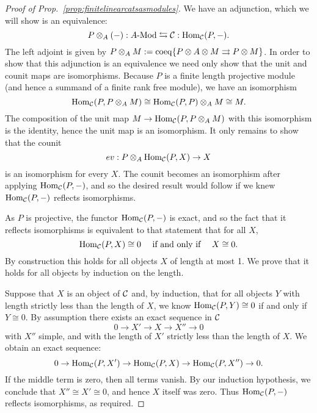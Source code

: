 \documentclass{amsart}
\begin{document}
\begin{proof}[Proof of Prop.~\ref{prop:finitelinearcatsasmodules}]
We have an adjunction, which we will show is an equivalence:
	\begin{equation*}
		P \otimes_A (-):\Mod{A}{} \leftrightarrows \cC: \Hom_{\cC}(P,-).
	\end{equation*}
	The left adjoint is given by $P \otimes_A M := \operatorname{coeq}\{ P \otimes A \otimes M \rightrightarrows P \otimes M\}$.  In order to show that this adjunction is an equivalence we need only show that the unit and counit maps are isomorphisms.
Because $P$ is a finite length projective module (and hence a summand of a finite rank free module), we have an isomorphism
\begin{equation*}
	\operatorname{Hom}_{\mathcal C}(P, P \otimes_A M) \cong \operatorname{Hom}_{\mathcal C}(P, P) \otimes_A M \cong M.
\end{equation*}
The composition of the unit map $M \rightarrow\operatorname{Hom}_{\mathcal C}(P, P \otimes_A M)$ with this isomorphism is the identity, hence the unit map is an isomorphism. It only remains to show that the counit 
\begin{equation*}
	ev:P \otimes_A \operatorname{Hom}_{\mathcal C}(P, X) \to X
\end{equation*}
is an isomorphism for every $X$. The counit becomes an isomorphism after applying $\operatorname{Hom}_{\mathcal C}(P,-)$, and so the desired result would follow if we knew $\operatorname{Hom}_{\mathcal C}(P,-)$ reflects isomorphisms. 

As $P$ is projective, the functor $\operatorname{Hom}_{\mathcal C}(P,-)$ is exact, and so the fact that it reflects isomorphisms is equivalent to that statement that for all $X$, 
\begin{equation*}
	\operatorname{Hom}_{\mathcal C}(P,X) \cong 0 \quad \textrm{ if and only if } \quad X \cong 0.
\end{equation*} 
By construction this holds for all objects $X$ of length at most 1. We prove that it holds for all objects by induction on the length. 

Suppose that $X$ is an object of $\mathcal C$ and, by induction, that for all objects $Y$ with length strictly less than the length of $X$, we know $\operatorname{Hom}_{\mathcal C}(P,Y) \cong 0$ if and only if $Y \cong 0$. By assumption there exists an exact sequence in $\mathcal C$
\begin{equation*}
	0 \to X' \to X \to X'' \to 0
\end{equation*}
with $X''$ simple, and with the length of $X'$ strictly less than the length of $X$. We obtain an exact sequence:
\begin{equation*}
	0 \to \operatorname{Hom}_{\mathcal C}(P,X') \to \operatorname{Hom}_{\mathcal C}(P,X) \to \operatorname{Hom}_{\mathcal C}(P,X'') \to 0.
\end{equation*}
If the middle term is zero, then all terms vanish. By our induction hypothesis, we conclude that $X'' \cong X' \cong 0$, and hence $X$ itself was zero. Thus $\operatorname{Hom}_{\mathcal C}(P,-)$ reflects isomorphisms, as required.
\end{proof}
\end{document}
